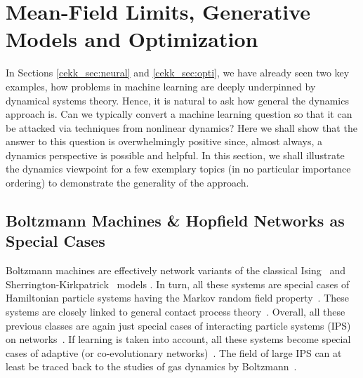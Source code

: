 \documentclass[10pt]{article}
\begin{document}
\section{Mean-Field Limits, Generative Models and Optimization}
\label{cekk_sec:multi}

In Sections \ref{cekk_sec:neural} and \ref{cekk_sec:opti}, we have already seen two key examples, how problems in machine learning are deeply underpinned by dynamical systems theory. Hence, it is natural to ask how general the dynamics approach is. Can we typically convert a machine learning question so that it can be attacked via techniques from nonlinear dynamics? Here we shall show that the answer to this question is overwhelmingly positive since, almost always, a dynamics perspective is possible and helpful. In this section, we shall illustrate the dynamics viewpoint for a few exemplary topics (in no particular importance ordering) to demonstrate the generality of the approach.

\subsection{Boltzmann Machines \& Hopfield Networks as Special Cases}
\label{cekk_sec:Boltzmann}

Boltzmann machines are effectively network variants of the classical Ising~\cite{Ising} and Sherrington-Kirkpatrick~\cite{SherringtonKirkpatrick} models . In turn, all these systems are special cases of Hamiltonian particle systems having the Markov random field property~\cite{Isham}. These systems are closely linked to general contact process theory~\cite{Liggett}. Overall, all these previous classes are again just special cases of interacting particle systems (IPS) on networks~\cite{Newman,PorterGleeson}. If learning is taken into account, all these systems become special cases of adaptive (or co-evolutionary networks)~\cite{Berneretal}. The field of large IPS can at least be traced back to the studies of gas dynamics by Boltzmann~\cite{Boltzmann,Cercignani,Golse}. 
\end{document}
